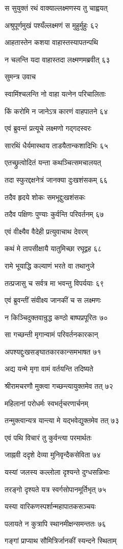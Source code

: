 स सुयुक्तं रथं वाक्याल्लक्ष्मणस्य तु चाह्वयत्

अश्रुपूर्णमुखं पश्यँल्लक्ष्मणं स मुहुर्मुहुः ६२

आहतास्तेन कशया वाहास्तस्यापतन्पथि

न चलन्ति यदा वाहास्तदा लक्ष्मणमब्रवीत् ६३

सुमन्त्र उवाच

स्वामिंश्चलन्ति नो वाहा यत्नेन परिचालिताः

किं करोमि न जानेऽत्र कारणं वाहपातने ६४

एवं ब्रुवन्तं प्रत्यूचे लक्ष्मणो गद्गदस्वरः

सारथिं धैर्यमास्थाय ताडयैतान्कशादिभिः ६५

एतच्छ्रुत्वोदितं यन्ता कथञ्चित्समचालयत्

तदा स्फुरद्दक्षनेत्रं जानक्या दुःखशंसकम् ६६

तदैव हृदये शोकः समभूद्दुःखशंसकः

तदैव पक्षिणः पुण्याः कुर्वन्ति परिवर्तनम् ६७

एवं वीक्ष्यैव वैदेही प्रत्युवाचाथ देवरम्

कथं मे तापसीक्षायै यातुमिच्छा रघूद्वह ६८

रामे भूयाद्धि कल्याणं भरते वा तथानुजे

तत्प्रजासु च सर्वत्र मा भवन्तु विपर्ययाः ६९

एवं ब्रुवन्तीं संवीक्ष्य जानकीं च स लक्ष्मणः

न किञ्चिदुक्तवान्रुद्ध कण्ठो बाष्पप्रपूरितः ७०

सा गच्छन्ती मृगान्वामं परिवर्तनकारकान्

अपश्यद्दुःखसङ्घातकारकान्समभाषत ७१

अद्य यन्मे मृगा वामं वर्तयन्ति तदिष्यते

श्रीरामचरणौ मुक्त्वा गच्छन्त्यायुक्तमेव तत् ७२

महिलानां परोधर्मः स्वभर्तृचरणार्चनम्

तन्मुक्त्वान्यत्र यान्त्या मे यद्भवेद्युक्तमेव तत् ७३

एवं पथि विचारं तु कुर्वन्त्या परमार्थतः

जाह्नवी ददृशे देव्या मुनिवृन्दैकसेविता ७४

यस्यां जलस्य कल्लोला दृश्यन्ते दुग्धसन्निभाः

तरङ्गो दृश्यते यत्र स्वर्गसोपानमूर्तिभृत् ७५

यस्या वारिकणस्पर्शान्महापातकसञ्चयः

पलायते न कुत्रापि स्थानमीक्षन्समन्ततः ७६

गङ्गां प्राप्याथ सौमित्रिर्जानकीं स्यन्दने स्थिताम्

